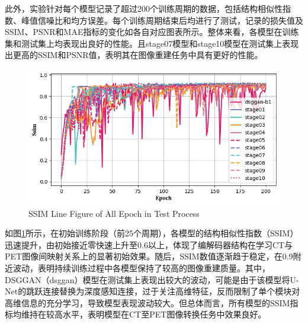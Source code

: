 \documentclass[twocolumn]{article}
\begin{document}
此外，实验针对每个模型记录了超过200个训练周期的数据，包括结构相似性指数、峰值信噪比和均方误差。每个训练周期结束后均进行了测试，记录的损失值及SSIM、PSNR和MAE指标的变化如各自对应图表所示。整体来看，各模型在训练集和测试集上均表现出良好的性能。且stage07模型和stage10模型在测试集上表现出更高的SSIM和PSNR值，表明其在图像重建任务中具有更好的性能。

\begin{figure}[h]
	\centering
	\includegraphics[width=1.0\linewidth]{u-net/lung/csv_stage01_10_dsg_lung_evalu_csv_img_2025_04_06_15_44_18/ssim_comparison}
	\caption[ssim]{SSIM Line Figure of All Epoch in Test Process}
	\label{fig:ssim}
\end{figure}


如图\ref{fig:ssim}所示，在初始训练阶段（前25个周期），各模型的结构相似性指数（SSIM）迅速提升，由初始接近零快速上升至0.6以上，体现了编解码器结构在学习CT与PET图像间映射关系上的显著初始效果。随后，SSIM数值逐渐趋于稳定，在0.9附近波动，表明持续训练过程中各模型保持了较高的图像重建质量。其中，DSGGAN（dsggan）模型在测试集上表现出较大的波动，可能是由于该模型将U-Net的跳跃连接替换为深度感知连接，过于关注高维特征，反而限制了单个模块对高维信息的充分学习，导致模型表现波动较大。但总体而言，所有模型的SSIM指标均维持在较高水平，表明模型在CT至PET图像转换任务中效果良好。
\end{document}
